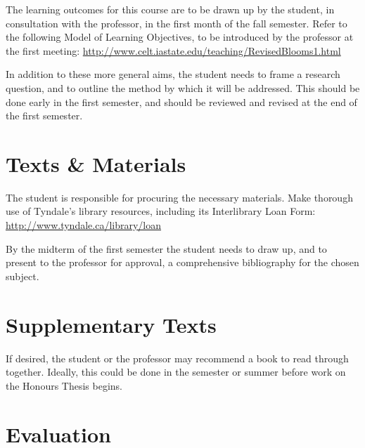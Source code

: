 \documentclass[titlepage]{article}
\begin{document}
The learning outcomes for this course are to be drawn up by the student,
in consultation with the professor, in the first month of the fall
semester. Refer to the following Model of Learning Objectives, to be
introduced by the professor at the first meeting:
\url{http://www.celt.iastate.edu/teaching/RevisedBlooms1.html}

In addition to these more general aims, the student needs to frame a
research question, and to outline the method by which it will be
addressed. This should be done early in the first semester, and should
be reviewed and revised at the end of the first semester.

\section{Texts \& Materials}
\label{texts}

The student is responsible for procuring the necessary materials. Make
thorough use of Tyndale's library resources, including its Interlibrary
Loan Form: \url{http://www.tyndale.ca/library/loan}

By the midterm of the first semester the student needs to draw up, and
to present to the professor for approval, a comprehensive bibliography
for the chosen subject.

\section{Supplementary Texts}
\label{supplementary}

If desired, the student or the professor may recommend a book to read
through together. Ideally, this could be done in the semester or summer
before work on the Honours Thesis begins.

\section{Evaluation}
\label{evaluation}


\end{document}
